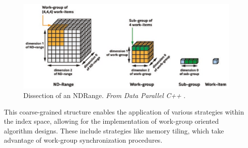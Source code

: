 \begin{figure}[H]
	\centering
	\includegraphics[width=\linewidth]{images/nd_range.png}
	\caption{Dissection of an NDRange. \textit{From Data Parallel C++} \cite{Reinders:2023:Data}.}
	\label{fig:ndrange}
\end{figure}

This coarse-grained structure enables the application of various strategies within the index space, allowing for the implementation of work-group oriented algorithm designs.
These include strategies like memory tiling, which take advantage of work-group synchronization procedures.
